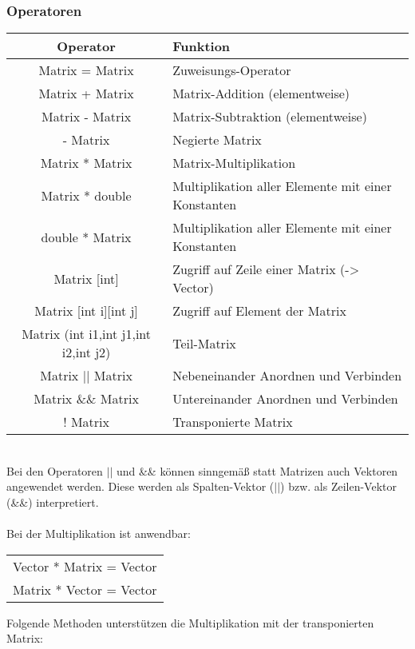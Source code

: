 
\subsubsection{Operatoren}
\begin{tabular}{|c|l|}
\hline
Operator & Funktion \\
\hline
Matrix = Matrix & Zuweisungs-Operator \\
Matrix + Matrix & Matrix-Addition (elementweise)\\
Matrix - Matrix & Matrix-Subtraktion (elementweise)\\
- Matrix & Negierte Matrix\\
Matrix * Matrix & Matrix-Multiplikation \\
Matrix * double & Multiplikation aller Elemente mit einer Konstanten \\
double * Matrix & Multiplikation aller Elemente mit einer Konstanten \\
Matrix [int] & Zugriff auf Zeile einer Matrix (-> Vector) \\
Matrix [int i][int j] & Zugriff auf Element der Matrix\\
Matrix (int i1,int j1,int i2,int j2) & Teil-Matrix \\
Matrix $||$ Matrix & Nebeneinander Anordnen und Verbinden \\
Matrix \&\& Matrix & Untereinander Anordnen und Verbinden \\
! Matrix & Transponierte Matrix \\
\hline
\end{tabular} \\
Bei den Operatoren $||$ und \&\& können sinngemäß statt Matrizen auch 
Vektoren angewendet werden. Diese werden als Spalten-Vektor ($||$) bzw.
als Zeilen-Vektor (\&\&) interpretiert.\\
\\
Bei der Multiplikation ist anwendbar:
\begin{tabular}{l}
Vector * Matrix = Vector\\
Matrix * Vector = Vector\\
\end{tabular}

Folgende Methoden unterstützen die Multiplikation mit der transponierten
Matrix:

